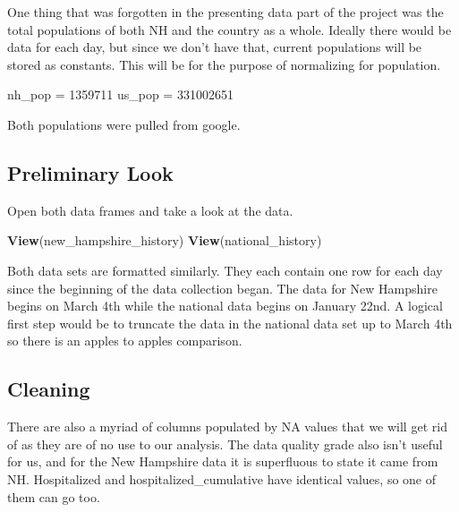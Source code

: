 \documentclass[
]{article}
\newenvironment{Shaded}{\begin{snugshade}}{\end{snugshade}}
\newcommand{\DecValTok}[1]{\textcolor[rgb]{0.00,0.00,0.81}{#1}}
\newcommand{\KeywordTok}[1]{\textcolor[rgb]{0.13,0.29,0.53}{\textbf{#1}}}
\newcommand{\NormalTok}[1]{#1}
\newcommand{\StringTok}[1]{\textcolor[rgb]{0.31,0.60,0.02}{#1}}
\begin{document}
One thing that was forgotten in the presenting data part of the project
was the total populations of both NH and the country as a whole. Ideally
there would be data for each day, but since we don't have that, current
populations will be stored as constants. This will be for the purpose of
normalizing for population.

\begin{Shaded}
\begin{Highlighting}[]
\NormalTok{nh_pop =}\StringTok{ }\DecValTok{1359711}
\NormalTok{us_pop =}\StringTok{ }\DecValTok{331002651}
\end{Highlighting}
\end{Shaded}

Both populations were pulled from google.

\hypertarget{preliminary-look}{%
\subsection{Preliminary Look}\label{preliminary-look}}

Open both data frames and take a look at the data.

\begin{Shaded}
\begin{Highlighting}[]
\KeywordTok{View}\NormalTok{(new_hampshire_history)}
\KeywordTok{View}\NormalTok{(national_history)}
\end{Highlighting}
\end{Shaded}

Both data sets are formatted similarly. They each contain one row for
each day since the beginning of the data collection began. The data for
New Hampshire begins on March 4th while the national data begins on
January 22nd. A logical first step would be to truncate the data in the
national data set up to March 4th so there is an apples to apples
comparison.

\hypertarget{cleaning}{%
\subsection{Cleaning}\label{cleaning}}

There are also a myriad of columns populated by NA values that we will
get rid of as they are of no use to our analysis. The data quality grade
also isn't useful for us, and for the New Hampshire data it is
superfluous to state it came from NH. Hospitalized and
hospitalized\_cumulative have identical values, so one of them can go
too.
\end{document}
